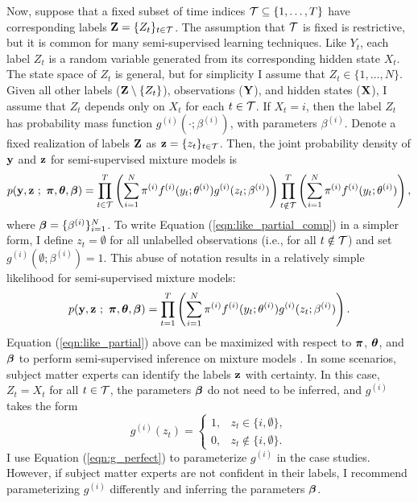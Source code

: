 Now, suppose that a fixed subset of time indices $\mathcal{T} \subseteq \{1,\ldots,T\}$ have corresponding labels $\mathbf{Z} = \{Z_t\}_{t \in \mathcal{T}}$. The assumption that $\mathcal{T}$ is fixed is restrictive, but it is common for many semi-supervised learning techniques. Like $Y_t$, each label $Z_t$ is a random variable generated from its corresponding hidden state $X_t$. The state space of $Z_t$ is general, but for simplicity I assume that $Z_t \in \{1,\ldots,N\}$. Given all other labels ($\mathbf{Z} \setminus \{Z_t\}$), observations ($\mathbf{Y}$), and hidden states ($\mathbf{X}$), I assume that $Z_t$ depends only on $X_t$ for each $t \in \mathcal{T}$. If $X_t = i$, then the label $Z_t$ has probability mass function $g^{(i)}(\cdot ; \beta^{(i)})$, with parameters $\beta^{(i)}$. Denote a fixed realization of labels $\mathbf{Z}$ as $\mathbf{z} = \{z_t\}_{t \in \mathcal{T}}$. Then, the joint probability density of $\mathbf{y}$ and $\mathbf{z}$ for semi-supervised mixture models is
%
\begin{gather}
    p(\mathbf{y},\mathbf{z} ~;~ \boldsymbol{\pi},\boldsymbol{\theta},\boldsymbol{\beta}) = \prod_{t \in \mathcal{T}}^T \left(\sum_{i = 1}^N \pi^{(i)} f^{(i)}(y_t; \theta^{(i)}) g^{(i)}(z_t ; \beta^{(i)}) \right) \prod_{t \notin \mathcal{T}}^T \left(\sum_{i = 1}^N \pi^{(i)} f^{(i)}(y_t; \theta^{(i)}) \right),
    \label{eqn:like_partial_comp} 
\end{gather}
%
where $\boldsymbol{\beta} = \{\beta^{(i)}\}_{i=1}^N$. To write Equation (\ref{eqn:like_partial_comp}) in a simpler form, I define $z_t = \emptyset$ for all unlabelled observations (i.e., for all $t \notin \mathcal{T}$) and set $g^{(i)}(\emptyset ; \beta^{(i)}) = 1$. This abuse of notation results in a relatively simple likelihood for semi-supervised mixture models:
%
\begin{gather}
    p(\mathbf{y},\mathbf{z} ~;~ \boldsymbol{\pi},\boldsymbol{\theta},\boldsymbol{\beta}) = \prod_{t = 1}^T \left(\sum_{i = 1}^N \pi^{(i)} f^{(i)}(y_t; \theta^{(i)}) g^{(i)}(z_t ; \beta^{(i)}) \right).
    \label{eqn:like_partial} 
\end{gather}
%
Equation (\ref{eqn:like_partial}) above can be maximized with respect to $\boldsymbol{\pi}$, $\boldsymbol{\theta}$, and $\boldsymbol{\beta}$ to perform semi-supervised inference on mixture models \citep{Chapelle:2006}.
%
In some scenarios, subject matter experts can identify the labels $\mathbf{z}$ with certainty. In this case, $Z_t = X_t$ for all $t \in \mathcal{T}$, the parameters $\boldsymbol{\beta}$ do not need to be inferred, and $g^{(i)}$ takes the form
\begin{equation}
    g^{(i)}(z_t) = 
    \begin{cases} 
        1, & z_t \in \{i,\emptyset\}, \\
        0, & z_t \notin \{i,\emptyset\}.
    \end{cases}
    \label{eqn:g_perfect}
\end{equation}
%
I use Equation (\ref{eqn:g_perfect}) to parameterize $g^{(i)}$ in the case studies. However, if subject matter experts are not confident in their labels, I recommend parameterizing $g^{(i)}$ differently and inferring the parameters $\boldsymbol{\beta}$. 

